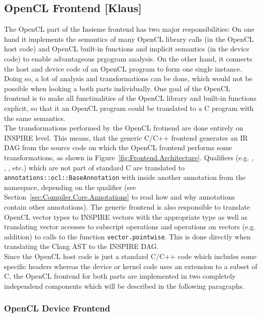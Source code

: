 \subsection{OpenCL Frontend [Klaus]}
\label{sec:Insieme.OpenCL}

The OpenCL part of the Insieme frontend has two major responsibilities: On one hand it implements the semantics of many OpenCL library calls (in the OpenCL host code) and OpenCL built-in functions and implicit semantics (in the device code) to enable advantageous prgogram analysis. On the other hand, it connects the host and device code of an OpenCL program to form one single instance. Doing so, a lot of analysis and transformations can be done, which would not be possible when looking a both parts individually. One goal of the OpenCL frontend is to make all functinalities of the OpenCL library and built-in functions explicit, so that it an OpenCL program could be translated to a C program with the same semantics. \\

The transformations performed by the OpenCL frotnend are done entirely on INSPIRE level. This means, that the generic C/C++ frontend generates an IR DAG from the source code on which the OpenCL frontend performs some transformations, as shown in Figure~\ref{fig:Frontend.Architecture}. Qualifiers (e.g. , , , etc.) which are not part of standard C are translated to \texttt{annotations::ocl::BaseAnnotation} with inside another annotation from the  namespace, depending on the qualifier (see Section~\ref{sec:Compiler.Core.Annotations} to read how and why annotations contain other annotations). The generic frontend is also responsible to translate OpenCL vector types to INSPIRE vectors with the appropriate type as well as translating vector accesses to subscript operations and operations on vectors (e.g. addition) to calls to the function \texttt{vector.pointwise}. This is done directly when translating the Clang AST to the INSPIRE DAG. \\

Since the OpenCL host code is just a standard C/C++ code which includes some specific headers whereas the device or kernel code uses an extension to a subset of C, the OpenCL frontend for both parts are implemented in two completely independend components which will be described in the following paragraphs. \\


\subsubsection{OpenCL Device Frontend}
\label{sec:Insieme.DeviceCL}

